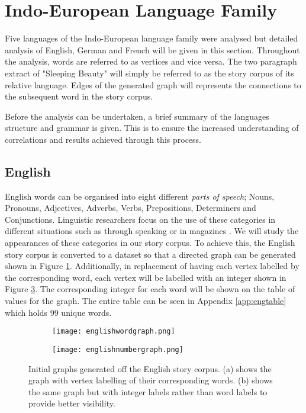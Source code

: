 \section{Indo-European Language Family}
Five languages of the Indo-European language family were analysed but detailed analysis of English, German and French will be given in this section. Throughout the analysis, words are referred to as vertices and vice versa. The two paragraph extract of "Sleeping Beauty" will simply be referred to as the story corpus of its relative language. Edges of the generated graph will represents the connections to the subsequent word in the story corpus. 

Before the analysis can be undertaken, a brief summary of the languages structure and grammar is given. This is to ensure the increased understanding of correlations and results achieved through this process.

\subsection{English}
English words can be organised into eight different \emph{parts of speech}; Nouns, Pronouns, Adjectives, Adverbs, Verbs, Prepositions, Determiners and Conjunctions. Linguistic researchers focus on the use of these categories in different situations such as through speaking or in magazines \cite{khaisaeng2017study}. We will study the appearances of these categories in our story corpus. To achieve this, the English story corpus is converted to a dataset so that a directed graph can be generated shown in Figure \ref{fig:engword}. Additionally, in replacement of having each vertex labelled by the corresponding word, each vertex will be labelled with an integer shown in Figure \ref{fig:engnum}. The corresponding integer for each word will be shown on the table of values for the graph. The entire table can be seen in Appendix \ref{app:engtable} which holds 99 unique words.

\begin{figure}[!htb]
\centering
\begin{subfigure}{.45\textwidth}
	\texttt{[image: englishwordgraph.png]}
	\caption{}
	\label{fig:engword}
\end{subfigure}
\hfill
\begin{subfigure}{.45\textwidth}
	\texttt{[image: englishnumbergraph.png]}
	\caption{}
	\label{fig:engnum}
\end{subfigure}
\caption{Initial graphs generated off the English story corpus. (a) shows the graph with vertex labelling of their corresponding words. (b) shows the same graph but with integer labels rather than word labels to provide better visibility.}
\end{figure}

